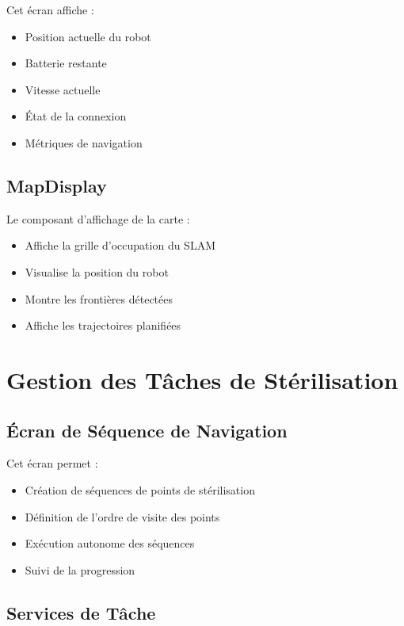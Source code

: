 \documentclass[12pt,a4paper,oneside]{report}
\begin{document}
Cet écran affiche :

\begin{itemize}
  \item Position actuelle du robot
  \item Batterie restante
  \item Vitesse actuelle
  \item État de la connexion
  \item Métriques de navigation
\end{itemize}

\subsection{MapDisplay}

Le composant d'affichage de la carte :

\begin{itemize}
  \item Affiche la grille d'occupation du SLAM
  \item Visualise la position du robot
  \item Montre les frontières détectées
  \item Affiche les trajectoires planifiées
\end{itemize}

\section{Gestion des Tâches de Stérilisation}

\subsection{Écran de Séquence de Navigation}

Cet écran permet :

\begin{itemize}
  \item Création de séquences de points de stérilisation
  \item Définition de l'ordre de visite des points
  \item Exécution autonome des séquences
  \item Suivi de la progression
\end{itemize}

\subsection{Services de Tâche}
\end{document}
